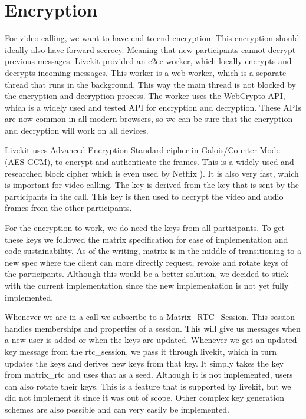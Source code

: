 \documentclass{report}
\begin{document}
\section{Encryption}

For video calling, we want to have end-to-end encryption. This encryption should ideally also have forward secrecy.
Meaning that new participants cannot decrypt previous messages. Livekit provided an e2ee worker, which locally
encrypts and decrypts incoming messages. This worker is a web worker, which is a separate thread that runs in the
background. This way the main thread is not blocked by the encryption and decryption process. The worker uses the
WebCrypto API, which is a widely used and tested API for encryption and decryption. These APIs are now common in all
modern browsers, so we can be sure that the encryption and decryption will work on all devices.

Livekit uses Advanced Encryption Standard cipher in Galois/Counter Mode (AES-GCM), to encrypt and authenticate the
frames. This is a widely used and researched block cipher which is even used by Netflix 
).
It is also very fast, which is important for video calling. The key is derived from the key that is sent by the
participants in the call. This key is then used to decrypt the video and audio frames from the other participants.


For the encryption to work, we do need the keys from all participants. To get these keys we followed the matrix
specification for ease of implementation and code sustainability. As of the writing, matrix is in the middle of
transitioning to a
new spec where the client can more directly request, revoke and rotate keys of the participants. Although this would
be a better solution, we decided to stick with the current implementation since the new implementation is not yet
fully implemented.

Whenever we are in a call we subscribe to a Matrix\_RTC\_Session. This session handles memberships and
properties of a session. This will give us messages when a new user is added or when the keys are updated.
Whenever we get an updated key message from the rtc\_session, we pass it through livekit, which in turn updates
the keys and derives new keys from that key. It simply takes the key from matrix\_rtc and uses
that as a seed. Although it is not implemented, users can also rotate their keys. This is a feature that is
supported by livekit, but we did not implement it since it was out of scope. Other complex key generation schemes
are also possible and can very easily be implemented.
\end{document}
